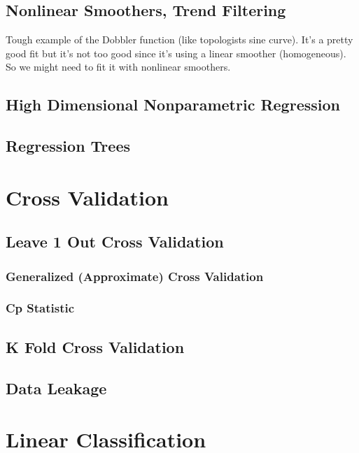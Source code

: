 \documentclass{article}
\begin{document}
  \subsection{Nonlinear Smoothers, Trend Filtering} 

    Tough example of the Dobbler function (like topologists sine curve). It's a pretty good fit but it's not too good since it's using a linear smoother (homogeneous). So we might need to fit it with nonlinear smoothers. 

  \subsection{High Dimensional Nonparametric Regression}

  \subsection{Regression Trees}

\section{Cross Validation} 

  \subsection{Leave 1 Out Cross Validation} 

    \subsubsection{Generalized (Approximate) Cross Validation} 

    \subsubsection{Cp Statistic}

  \subsection{K Fold Cross Validation}

  \subsection{Data Leakage}


\section{Linear Classification}
\end{document}
